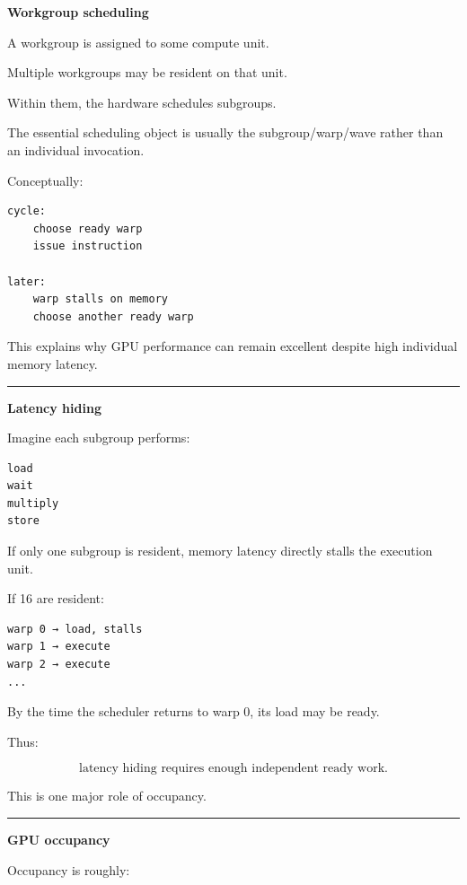 \textbf{Workgroup scheduling}

A workgroup is assigned to some compute unit.

Multiple workgroups may be resident on that unit.

Within them, the hardware schedules subgroups.

The essential scheduling object is usually the subgroup/warp/wave rather than an individual invocation.

Conceptually:

\protect{}\label{r4h73i}%
\begin{verbatim}
cycle:
    choose ready warp
    issue instruction

later:
    warp stalls on memory
    choose another ready warp
\end{verbatim}

This explains why GPU performance can remain excellent despite high individual memory latency.

\begin{center}\rule{0.5\linewidth}{0.5pt}\end{center}

\textbf{Latency hiding}

Imagine each subgroup performs:

\protect{}\label{6d38i1}%
\begin{verbatim}
load
wait
multiply
store
\end{verbatim}

If only one subgroup is resident, memory latency directly stalls the execution unit.

If 16 are resident:

\protect{}\label{bnfz56}%
\begin{verbatim}
warp 0 → load, stalls
warp 1 → execute
warp 2 → execute
...
\end{verbatim}

By the time the scheduler returns to warp 0, its load may be ready.

Thus:

\[
\boxed{
\text{latency hiding requires enough independent ready work}.
}
\]

This is one major role of occupancy.

\begin{center}\rule{0.5\linewidth}{0.5pt}\end{center}

\textbf{GPU occupancy}

Occupancy is roughly:

